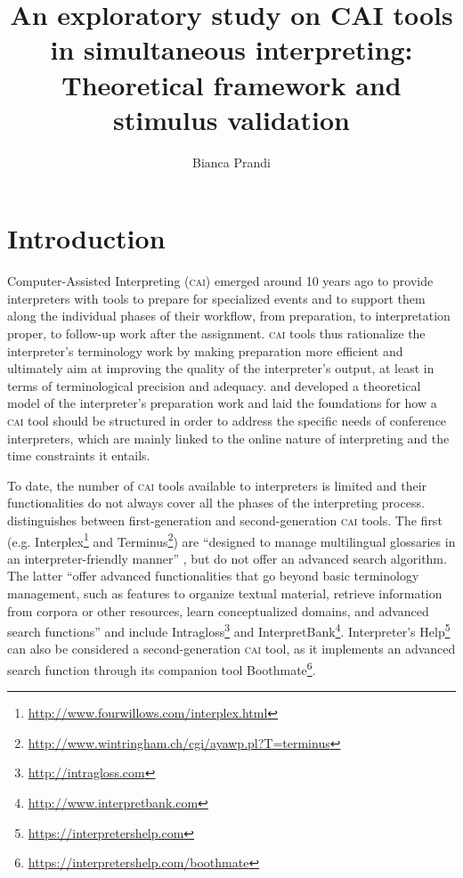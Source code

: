 \documentclass[output=paper]{langsci/langscibook}
\author{Bianca Prandi\affiliation{University of Mainz}}
\title{An exploratory study on CAI tools in simultaneous interpreting: Theoretical framework and stimulus validation}
\begin{document}
\section{Introduction}\label{sec:prandi:1}
Computer-Assisted Interpreting (\textsc{cai}) emerged around 10 years ago to provide interpreters with tools to prepare for specialized events and to support them along the individual phases of their workflow, from preparation, to interpretation proper, to follow-up work after the assignment. \textsc{cai} tools thus rationalize the interpret\-er’s terminology work by making preparation more efficient and ultimately aim at improving the quality of the interpreter’s output, at least in terms of terminological precision and adequacy. \citet{Rütten2007} and \citet{Will2009} developed a theoretical model of the interpreter’s preparation work and laid the foundations for how a \textsc{cai} tool should be structured in order to address the specific needs of conference interpreters, which are mainly linked to the online nature of interpreting and the time constraints it entails.

To date, the number of \textsc{cai} tools available to interpreters is limited and their functionalities do not always cover all the phases of the interpreting process. \citet{Fantinuoli2018} distinguishes between first-generation and second-generation \textsc{cai} tools. The first (e.g. Interplex\footnote{\url{http://www.fourwillows.com/interplex.html}} and Terminus\footnote{\url{http://www.wintringham.ch/cgi/ayawp.pl?T=terminus}}) are ``designed to manage multilingual glossaries in an interpreter-friendly manner'' \citep[164]{Fantinuoli2018}, but do not offer an advanced search algorithm. The latter ``offer advanced functionalities that go beyond basic terminology management, such as features to organize textual material, retrieve information from corpora or other resources, learn conceptualized domains, and advanced search functions'' \citep[164]{Fantinuoli2018} and include Intragloss\footnote{\url{http://intragloss.com}} and InterpretBank\footnote{\url{http://www.interpretbank.com}}. Interpreter’s Help\footnote{\url{https://interpretershelp.com}} can also be considered a second-generation \textsc{cai} tool, as it implements an advanced search function through its companion tool Boothmate\footnote{\url{https://interpretershelp.com/boothmate}}. 
\end{document}
